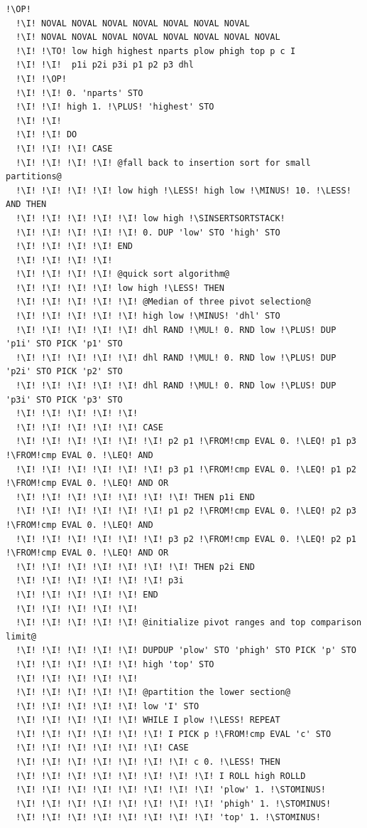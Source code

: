 \documentclass[12pt,a4paper]{report}
\newcommand{\kwd}[1]{\texttt{\textcolor{keyword}{#1}}}
\newcommand{\I}{\enspace\textcolor{indent}\vrule\hspace{2pt}}
\newcommand{\LESS}{\kwd{$<$}}   %
\newcommand{\LEQ}{\kwd{$\leq$}}   %
\newcommand{\PLUS}{\kwd{+}}   %
\newcommand{\MINUS}{\kwd{-}}   %
\newcommand{\MUL}{\kwd{*}}   %
\newcommand{\STOMINUS}{\kwd{STO-}} %
\newcommand{\SINSERTSORTSTACK}{\kwd{\$INSERTSORTSTACK}}   %
\newcommand{\OP}{\kwd{$\ll$}}   %
\newcommand{\TO}{\kwd{$\rightarrow$}} %
\newcommand{\FROM}{\kwd{$\leftarrow$}} %
\numberwithin{theorem}{chapter}
\begin{document}
\begin{lstlisting}[language=userrpl]
  !\OP!
  !\I! NOVAL NOVAL NOVAL NOVAL NOVAL NOVAL NOVAL
  !\I! NOVAL NOVAL NOVAL NOVAL NOVAL NOVAL NOVAL NOVAL
  !\I! !\TO! low high highest nparts plow phigh top p c I
  !\I! !\I!  p1i p2i p3i p1 p2 p3 dhl
  !\I! !\OP!
  !\I! !\I! 0. 'nparts' STO
  !\I! !\I! high 1. !\PLUS! 'highest' STO
  !\I! !\I!
  !\I! !\I! DO
  !\I! !\I! !\I! CASE
  !\I! !\I! !\I! !\I! @fall back to insertion sort for small partitions@
  !\I! !\I! !\I! !\I! low high !\LESS! high low !\MINUS! 10. !\LESS! AND THEN
  !\I! !\I! !\I! !\I! !\I! low high !\SINSERTSORTSTACK!
  !\I! !\I! !\I! !\I! !\I! 0. DUP 'low' STO 'high' STO
  !\I! !\I! !\I! !\I! END
  !\I! !\I! !\I! !\I!
  !\I! !\I! !\I! !\I! @quick sort algorithm@
  !\I! !\I! !\I! !\I! low high !\LESS! THEN
  !\I! !\I! !\I! !\I! !\I! @Median of three pivot selection@
  !\I! !\I! !\I! !\I! !\I! high low !\MINUS! 'dhl' STO
  !\I! !\I! !\I! !\I! !\I! dhl RAND !\MUL! 0. RND low !\PLUS! DUP 'p1i' STO PICK 'p1' STO
  !\I! !\I! !\I! !\I! !\I! dhl RAND !\MUL! 0. RND low !\PLUS! DUP 'p2i' STO PICK 'p2' STO
  !\I! !\I! !\I! !\I! !\I! dhl RAND !\MUL! 0. RND low !\PLUS! DUP 'p3i' STO PICK 'p3' STO
  !\I! !\I! !\I! !\I! !\I!
  !\I! !\I! !\I! !\I! !\I! CASE
  !\I! !\I! !\I! !\I! !\I! !\I! p2 p1 !\FROM!cmp EVAL 0. !\LEQ! p1 p3 !\FROM!cmp EVAL 0. !\LEQ! AND
  !\I! !\I! !\I! !\I! !\I! !\I! p3 p1 !\FROM!cmp EVAL 0. !\LEQ! p1 p2 !\FROM!cmp EVAL 0. !\LEQ! AND OR
  !\I! !\I! !\I! !\I! !\I! !\I! !\I! THEN p1i END
  !\I! !\I! !\I! !\I! !\I! !\I! p1 p2 !\FROM!cmp EVAL 0. !\LEQ! p2 p3 !\FROM!cmp EVAL 0. !\LEQ! AND
  !\I! !\I! !\I! !\I! !\I! !\I! p3 p2 !\FROM!cmp EVAL 0. !\LEQ! p2 p1 !\FROM!cmp EVAL 0. !\LEQ! AND OR
  !\I! !\I! !\I! !\I! !\I! !\I! !\I! THEN p2i END
  !\I! !\I! !\I! !\I! !\I! !\I! p3i
  !\I! !\I! !\I! !\I! !\I! END
  !\I! !\I! !\I! !\I! !\I!
  !\I! !\I! !\I! !\I! !\I! @initialize pivot ranges and top comparison limit@
  !\I! !\I! !\I! !\I! !\I! DUPDUP 'plow' STO 'phigh' STO PICK 'p' STO
  !\I! !\I! !\I! !\I! !\I! high 'top' STO
  !\I! !\I! !\I! !\I! !\I!
  !\I! !\I! !\I! !\I! !\I! @partition the lower section@
  !\I! !\I! !\I! !\I! !\I! low 'I' STO
  !\I! !\I! !\I! !\I! !\I! WHILE I plow !\LESS! REPEAT
  !\I! !\I! !\I! !\I! !\I! !\I! I PICK p !\FROM!cmp EVAL 'c' STO
  !\I! !\I! !\I! !\I! !\I! !\I! CASE
  !\I! !\I! !\I! !\I! !\I! !\I! !\I! c 0. !\LESS! THEN
  !\I! !\I! !\I! !\I! !\I! !\I! !\I! !\I! I ROLL high ROLLD
  !\I! !\I! !\I! !\I! !\I! !\I! !\I! !\I! 'plow' 1. !\STOMINUS!
  !\I! !\I! !\I! !\I! !\I! !\I! !\I! !\I! 'phigh' 1. !\STOMINUS!
  !\I! !\I! !\I! !\I! !\I! !\I! !\I! !\I! 'top' 1. !\STOMINUS!

\end{lstlisting}
\end{document}
